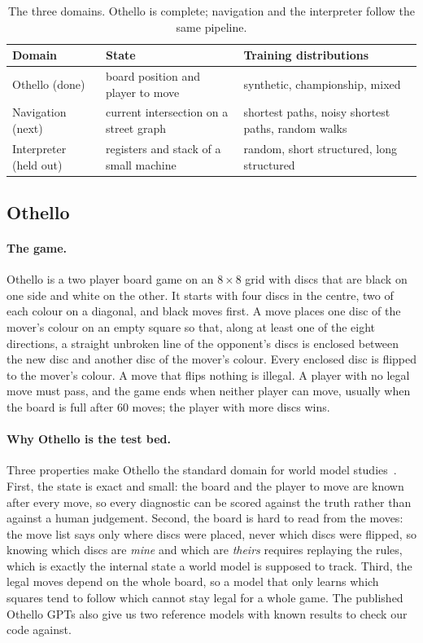 \documentclass[11pt]{scrartcl}
\begin{document}
\begin{table}[H]
    \centering
    \small
    \begin{tabular}{>{\raggedright\arraybackslash}p{3.2cm}>{\raggedright\arraybackslash}p{4.2cm}>{\raggedright\arraybackslash}p{6.6cm}}
    \toprule
    Domain & State & Training distributions \\
    \midrule
    Othello (done) & board position and player to move & synthetic, championship, mixed \\
    Navigation (next) & current intersection on a street graph & shortest paths, noisy shortest paths, random walks \\
    Interpreter (held out) & registers and stack of a small machine & random, short structured, long structured \\
    \bottomrule
    \end{tabular}
    \caption{The three domains. Othello is complete; navigation and the interpreter follow the same pipeline.}
    \label{tab:domains}
\end{table}

\subsection{Othello}

\paragraph{The game.} Othello is a two player board game on an $8\times8$ grid with discs that are black on
one side and white on the other. It starts with four discs in the centre, two of each colour on a diagonal,
and black moves first. A move places one disc of the mover's colour on an empty square so that, along at least
one of the eight directions, a straight unbroken line of the opponent's discs is enclosed between the new
disc and another disc of the mover's colour. Every enclosed disc is flipped to the mover's colour. A move
that flips nothing is illegal. A player with no legal move must pass, and the game ends when neither player
can move, usually when the board is full after 60 moves; the player with more discs wins.

\paragraph{Why Othello is the test bed.} Three properties make Othello the standard domain for world model
studies~\cite{li2023othello, nanda2023emergent}. First, the state is exact and small: the board and the player
to move are known after every move, so every diagnostic can be scored against the truth rather than against
a human judgement. Second, the board is hard to read from the moves: the move list says only where discs were
placed, never which discs were flipped, so knowing which discs are \emph{mine} and which are \emph{theirs}
requires replaying the rules, which is exactly the internal state a world model is supposed to track. Third,
the legal moves depend on the whole board, so a model that only learns which squares tend to follow which
cannot stay legal for a whole game. The published Othello GPTs also give us two reference models with known
results to check our code against.
\end{document}
